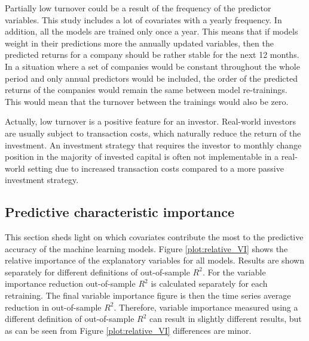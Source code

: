 \documentclass[12pt]{article}
\begin{document}
Partially low turnover could be a result of the frequency of the predictor variables. This study includes a lot of covariates with a yearly frequency. In addition, all the models are trained only once a year. This means that if models weight in their predictions more the annually updated variables, then the predicted returns for a company should be rather stable for the next 12 months. In a situation where a set of companies would be constant throughout the whole period and only annual predictors would be included, the order of the predicted returns of the companies would remain the same between model re-trainings. This would mean that the turnover between the trainings would also be zero. \par

Actually, low turnover is a positive feature for an investor. Real-world investors are usually subject to transaction costs, which naturally reduce the return of the investment. An investment strategy that requires the investor to monthly change position in the majority of invested capital is often not implementable in a real-world setting due to increased transaction costs compared to a more passive investment strategy. \par

\subsection{Predictive characteristic importance}\label{PredictiveCharacteristicImportance}

This section sheds light on which covariates contribute the most to the predictive accuracy of the machine learning models. Figure \ref{plot:relative_VI} shows the relative importance of the explanatory variables for all models. Results are shown separately for different definitions of out-of-sample $R^2$. For the variable importance reduction out-of-sample $R^2$ is calculated separately for each retraining. The final variable importance figure is then the time series average reduction in out-of-sample $R^2$. Therefore, variable importance measured using a different definition of out-of-sample $R^2$ can result in slightly different results, but as can be seen from Figure \ref{plot:relative_VI} differences are minor. \par
\end{document}
